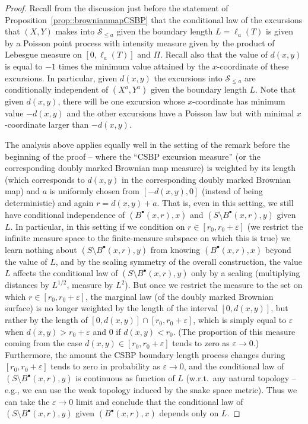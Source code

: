 \documentclass[10pt]{amsart}
\let\mathcal\mathscr
\newcommand{\sbullet}{{\scriptscriptstyle\bullet}}
\let\epsilon\varepsilon
\theoremstyle{plain}
\numberwithin{theorem}{section}
\theoremstyle{definition}
\newcommand{\snake}{{\mathcal S}}
\newcommand{\fb}[2]{B^\sbullet(#1,#2)}
\begin{document}
\begin{proof}
Recall from the discussion just before the statement of Proposition~\ref{prop::brownianmapCSBP} that the conditional law of the excursions that $(X,Y)$ makes into $\snake_{\leq a}$ given the boundary length $L = \ell_a(T)$ is given by a Poisson point process with intensity measure given by the product of Lebesgue measure on $[0,\ell_a(T)]$ and $\Pi$. Recall also that the value of $d(x,y)$ is equal to $-1$ times the minimum value attained by the $x$-coordinate of these excursions. In particular, given $d(x,y)$ the excursions into $\snake_{\leq a}$ are conditionally independent of $(X^a,Y^a)$ given the boundary length $L$. Note that given $d(x,y)$, there will be one excursion whose $x$-coordinate has minimum value $-d(x,y)$ and the other excursions have a Poisson law but with minimal $x$-coordinate larger than $-d(x,y)$.

The analysis above applies equally well in the setting of the remark before the beginning of the proof -- where the ``CSBP excursion measure'' (or the corresponding doubly marked Brownian map measure) is weighted by its length (which corresponds to $d(x,y)$ in the corresponding doubly marked Brownian map) and $a$ is uniformly chosen from $[-d(x,y), 0]$ (instead of being deterministic) and again $r = d(x,y) + a$. That is, even in this setting, we still have conditional independence of $(\fb{x}{r},x)$ and $(S \setminus \fb{x}{r},y)$ given $L$. In particular, in this setting if we condition on $r \in [r_0, r_0 + \epsilon]$ (\ie we restrict the infinite measure space to the finite-measure subspace on which this is true) we learn nothing about $(S \setminus \fb{x}{r},y)$ from knowing $(\fb{x}{r},x)$ beyond the value of $L$, and by the scaling symmetry of the overall construction, the value $L$ affects the conditional law of $(S \setminus \fb{x}{r},y)$ only by a scaling (multiplying distances by $L^{1/2}$, measure by $L^2$). But once we restrict the measure to the set on which $r \in [r_0, r_0 + \epsilon]$, the marginal law (of the doubly marked Brownian surface) is no longer weighted by the length of the interval $[0,d(x,y)]$, but rather by the length of $[0,d(x,y)] \cap [r_0, r_0 + \epsilon]$, which is simply equal to $\epsilon$ when $d(x,y) > r_0 + \epsilon$ and $0$ if $d(x,y) < r_0$. (The proportion of this measure coming from the case $d(x,y) \in [r_0, r_0+\epsilon]$ tends to zero as $\epsilon \to 0$.) Furthermore, the amount the CSBP boundary length process changes during $[r_0, r_0+\epsilon]$ tends to zero in probability as $\epsilon \to 0$, and the conditional law of $(S \setminus \fb{x}{r},y)$ is continuous as function of $L$ (w.r.t.\ any natural topology -- e.g., we can use the weak topology induced by the snake space metric). Thus we can take the $\epsilon \to 0$ limit and conclude that the conditional law of $(S \setminus \fb{x}{r},y)$ given $(\fb{x}{r},x)$ depends only on $L$.
\end{proof}
\end{document}
